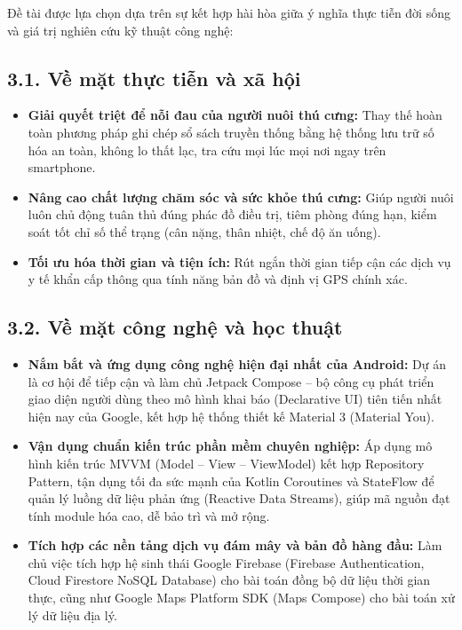 Đề tài được lựa chọn dựa trên sự kết hợp hài hòa giữa ý nghĩa thực tiễn đời sống và giá trị nghiên cứu kỹ thuật công nghệ:

\subsection*{3.1. Về mặt thực tiễn và xã hội}
\begin{itemize}
    \item \textbf{Giải quyết triệt để nỗi đau của người nuôi thú cưng:} Thay thế hoàn toàn phương pháp ghi chép sổ sách truyền thống bằng hệ thống lưu trữ số hóa an toàn, không lo thất lạc, tra cứu mọi lúc mọi nơi ngay trên smartphone.
    \item \textbf{Nâng cao chất lượng chăm sóc và sức khỏe thú cưng:} Giúp người nuôi luôn chủ động tuân thủ đúng phác đồ điều trị, tiêm phòng đúng hạn, kiểm soát tốt chỉ số thể trạng (cân nặng, thân nhiệt, chế độ ăn uống).
    \item \textbf{Tối ưu hóa thời gian và tiện ích:} Rút ngắn thời gian tiếp cận các dịch vụ y tế khẩn cấp thông qua tính năng bản đồ và định vị GPS chính xác.
\end{itemize}

\subsection*{3.2. Về mặt công nghệ và học thuật}
\begin{itemize}
    \item \textbf{Nắm bắt và ứng dụng công nghệ hiện đại nhất của Android:} Dự án là cơ hội để tiếp cận và làm chủ Jetpack Compose -- bộ công cụ phát triển giao diện người dùng theo mô hình khai báo (Declarative UI) tiên tiến nhất hiện nay của Google, kết hợp hệ thống thiết kế Material 3 (Material You).
    \item \textbf{Vận dụng chuẩn kiến trúc phần mềm chuyên nghiệp:} Áp dụng mô hình kiến trúc MVVM (Model -- View -- ViewModel) kết hợp Repository Pattern, tận dụng tối đa sức mạnh của Kotlin Coroutines và StateFlow để quản lý luồng dữ liệu phản ứng (Reactive Data Streams), giúp mã nguồn đạt tính module hóa cao, dễ bảo trì và mở rộng.
    \item \textbf{Tích hợp các nền tảng dịch vụ đám mây và bản đồ hàng đầu:} Làm chủ việc tích hợp hệ sinh thái Google Firebase (Firebase Authentication, Cloud Firestore NoSQL Database) cho bài toán đồng bộ dữ liệu thời gian thực, cũng như Google Maps Platform SDK (Maps Compose) cho bài toán xử lý dữ liệu địa lý.
\end{itemize}


